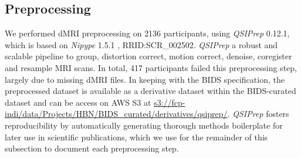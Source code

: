 \documentclass[9pt,lineno]{elife}
\begin{document}
\subsection{Preprocessing}

We performed dMRI preprocessing on \num{2136} participants, using \emph{QSIPrep}
\citep{cieslak2021-iq} 0.12.1, which is based on \emph{Nipype} 1.5.1
\citep{nipype1,nipype2}, RRID:SCR\_002502. \emph{QSIPrep} a robust and scalable
pipeline to group, distortion correct, motion correct, denoise, coregister and
resample MRI scans. In total, \num{417} participants failed this preprocessing
step, largely due to missing dMRI files. 
In keeping with the BIDS specification,
the preprocessed dataset is available as a derivative dataset within the
BIDS-curated dataset and can be access on AWS S3 at
\url{s3://fcp-indi/data/Projects/HBN/BIDS_curated/derivatives/qsiprep/}.
\emph{QSIPrep} fosters reproducibility by automatically generating thorough
methods boilerplate for later use in scientific publications, which we use for
the remainder of this subsection to document each preprocessing step.
\end{document}
